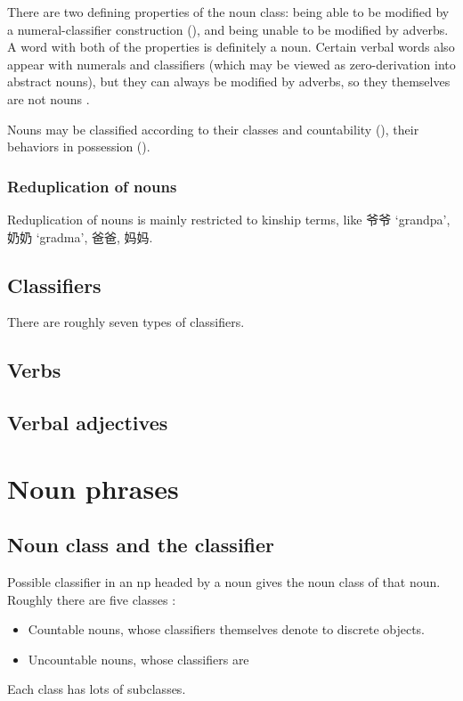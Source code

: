 \documentclass[UTF8, a4paper, oneside, scheme=plain]{ctexart}
\newcommand*{\citesec}[1]{\S~{#1}}
\newcommand{\translate}[1]{`#1'}
\begin{document}
There are two defining properties of the noun class:
being able to be modified by a numeral-classifier construction (),
and being unable to be modified by adverbs. %
A word with both of the properties is definitely a noun.
Certain verbal words also appear with numerals and classifiers 
(which may be viewed as zero-derivation into abstract nouns),
but they can always be modified by adverbs,
so they themselves are not nouns \citep[\citesec{4.1.1}]{zhudexigrammar}.

Nouns may be classified according to 
their classes and countability (),
their behaviors in possession ().

\subsubsection{Reduplication of nouns}\label{sec:reduplication-noun}

Reduplication of nouns is mainly restricted to kinship terms,
like 爷爷 \translate{grandpa}, 奶奶 \translate{gradma}, 爸爸, 妈妈.

\subsection{Classifiers}\label{sec:classifiers}

There are roughly seven types of classifiers. %

\subsection{Verbs}

\subsection{Verbal adjectives}


\section{Noun phrases}

\subsection{Noun class and the classifier}\label{sec:noun-class-classifier}

Possible classifier in an \ac{np} headed by a noun 
gives the noun class of that noun.
Roughly there are five classes \citep[\citesec{4.1.2}]{zhudexigrammar}:
\begin{itemize} %
    \item Countable nouns, whose classifiers themselves denote to discrete objects.
    \item Uncountable nouns, whose classifiers are 
\end{itemize}
Each class has lots of subclasses.
\end{document}
